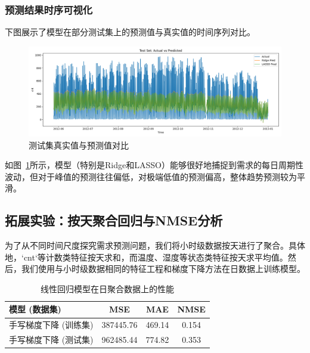 \documentclass[UTF8,a4paper,10pt]{ctexart}
\begin{document}
\subsubsection{预测结果时序可视化}
下图展示了模型在部分测试集上的预测值与真实值的时间序列对比。
\begin{figure}[H]
    \centering
    \includegraphics[width=\linewidth]{pic/actual_vs_predicted.png}
    \caption{测试集真实值与预测值对比}
    \label{fig:timeseries}
\end{figure}
如图~\ref{fig:timeseries}所示，模型（特别是Ridge和LASSO）能够很好地捕捉到需求的每日周期性波动，但对于峰值的预测往往偏低，对极端低值的预测偏高，整体趋势预测较为平滑。

\subsection{拓展实验：按天聚合回归与NMSE分析}
为了从不同时间尺度探究需求预测问题，我们将小时级数据按天进行了聚合。具体地，`cnt`等计数类特征按天求和，而温度、湿度等状态类特征按天求平均值。然后，我们使用与小时级数据相同的特征工程和梯度下降方法在日数据上训练模型。

\begin{table}[H]
    \centering
    \caption{线性回归模型在日聚合数据上的性能}
    \begin{tabular}{lccc}
        \toprule
        \textbf{模型 (数据集)} & \textbf{MSE} & \textbf{MAE} & \textbf{NMSE} \\
        \midrule
        手写梯度下降 (训练集) & 387445.76 & 469.14 & 0.154 \\
        手写梯度下降 (测试集) & 962485.44 & 774.82 & 0.353 \\
        \bottomrule
    \end{tabular}
\end{table}
\end{document}
